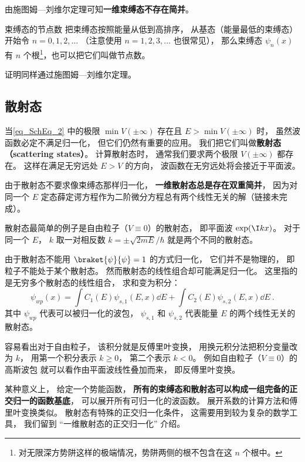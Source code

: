 由施图姆—刘维尔定理可知\textbf{一维束缚态不存在简并}。

\begin{theorem}{束缚态的节点数}
把束缚态按照能量从低到高排序， 从基态（能量最低的束缚态）开始令 $n = 0,1,2,\dots$ （注意使用 $n=1,2,3,\dots$ 也很常见）， 那么束缚态 $\psi_n(x)$ 有 $n$ 个根\footnote{对无限深方势阱这样的极端情况，势阱两侧的根不包含在这 $n$ 个根中。}，也可以把它们叫做节点数。
\end{theorem}
证明同样通过施图姆—刘维尔定理。

\subsection{散射态}
当\autoref{eq_SchEq_2} 中的极限 $\min V(\pm\infty)$ 存在且 $E > \min V(\pm\infty)$ 时， 虽然波函数必定不满足归一化， 但它们仍然有重要的应用。 我们把它们叫做\textbf{散射态（scattering states）}。 计算散射态时， 通常我们要求两个极限 $V(\pm \infty)$ 都存在。 这样在满足无穷远处 $E > V$ 的方向， 波函数在无穷远处将会接近于平面波。

由于散射态不要求像束缚态那样归一化， \textbf{一维散射态总是存在双重简并}， 因为对同一个 $E$ 定态薛定谔方程作为二阶微分方程总有两个线性无关的解（链接未完成）。

散射态最简单的例子是自由粒子（$V\equiv 0$）的散射态， 即平面波 $\exp(\I kx)$。 对于同一个 $E$， $k$ 取一对相反数 $k = \pm\sqrt{2mE}/\hbar$ 就是两个不同的散射态。

由于散射态不能用 $\braket{\psi}{\psi} = 1$ 的方式归一化， 它们并不是物理的， 即粒子不能处于某个散射态。 然而散射态的线性组合却可能满足归一化。 这里指的是无穷多个散射态的线性组合， 求和变为积分：
\begin{equation}
\psi_{wp}(x) = \int C_1(E) \psi_{s,1}(E, x)\dd{E} + \int C_2(E) \psi_{s,2}(E, x)\dd{E}~.
\end{equation}
其中 $\psi_{wp}$ 代表可以被归一化的波包， $\psi_{s,1}$ 和 $\psi_{s,2}$ 代表能量 $E$ 的两个线性无关的散射态。

容易看出对于自由粒子， 该积分就是反傅里叶变换， 用换元积分法把积分变量改为 $k$， 用第一个积分表示 $k\ge 0$， 第二个表示 $k<0$。 例如自由粒子（$V \equiv 0$）的高斯波包 就可以看作由平面波线性叠加而来， 即反傅里叶变换。

某种意义上， 给定一个势能函数， \textbf{所有的束缚态和散射态可以构成一组完备的正交归一的函数基底}， 可以展开所有可归一化的波函数。 展开系数的计算方法和傅里叶变换类似。 散射态有特殊的正交归一化条件， 这需要用到较为复杂的数学工具， 我们留到 “一维散射态的正交归一化” 介绍。

